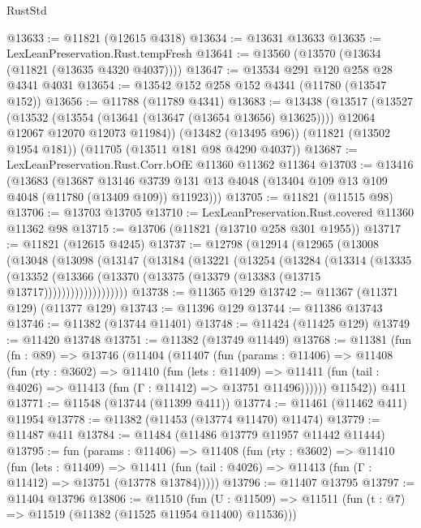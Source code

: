 \begin{lexlean}{RustStd}
\begin{coremodule}
@13633 := @11821 (@12615 @4318)
@13634 := @13631 @13633
@13635 := LexLeanPreservation.Rust.tempFresh
@13641 := @13560 (@13570 (@13634 (@11821 (@13635 @4320 @4037))))
@13647 := @13534 @291 @120 @258 @28 @4341 @4031
@13654 := @13542 @152 @258 @152 @4341 (@11780 (@13547 @152))
@13656 := @11788 (@11789 @4341)
@13683 := @13438
    (@13517
      (@13527
        (@13532 (@13554 (@13641 (@13647 (@13654 @13656) @13625))))
        @12064
        @12067
        @12070
        @12073
        @11984))
    (@13482 (@13495 @96))
    (@11821 (@13502 @1954 @181))
    (@11705 (@13511 @181 @98 @4290 @4037))
@13687 := LexLeanPreservation.Rust.Corr.bOfE @11360 @11362 @11364
@13703 := @13416
    (@13683
      (@13687
        @13146
        @3739
        @131
        @13
        @4048
        (@13404 @109 @13 @109 @4048 (@11780 (@13409 @109)) @11923)))
@13705 := @11821 (@11515 @98)
@13706 := @13703 @13705
@13710 := LexLeanPreservation.Rust.covered @11360 @11362 @98
@13715 := @13706 (@11821 (@13710 @258 @301 @1955))
@13717 := @11821 (@12615 @4245)
@13737 := @12798
    (@12914
      (@12965
        (@13008
          (@13048
            (@13098
              (@13147
                (@13184
                  (@13221
                    (@13254
                      (@13284
                        (@13314
                          (@13335
                            (@13352
                              (@13366
                                (@13370 (@13375 (@13379 (@13383 (@13715 @13717)))))))))))))))))))
@13738 := @11365 @129
@13742 := @11367 (@11371 @129) (@11377 @129)
@13743 := @11396 @129
@13744 := @11386 @13743
@13746 := @11382 (@13744 @11401)
@13748 := @11424 (@11425 @129)
@13749 := @11420 @13748
@13751 := @11382 (@13749 @11449)
@13768 := @11381
    (fun (fn : @89) =>
    @13746
      (@11404
        (@11407
          (fun (params : @11406) =>
          @11408
            (fun (rty : @3602) =>
            @11410
              (fun (lets : @11409) =>
              @11411 (fun (tail : @4026) => @11413 (fun (Γ : @11412) => @13751 @11496))))))
        @11542))
    @411
@13771 := @11548 (@13744 (@11399 @411))
@13774 := @11461 (@11462 @411) @11954
@13778 := @11382 (@11453 (@13774 @11470) @11474)
@13779 := @11487 @411
@13784 := @11484 (@11486 @13779 @11957 @11442 @11444)
@13795 := fun (params : @11406) =>
  @11408
    (fun (rty : @3602) =>
    @11410
      (fun (lets : @11409) =>
      @11411 (fun (tail : @4026) => @11413 (fun (Γ : @11412) => @13751 (@13778 @13784)))))
@13796 := @11407 @13795
@13797 := @11404 @13796
@13806 := @11510
    (fun (U : @11509) => @11511 (fun (t : @7) => @11519 (@11382 (@11525 @11954 @11400) @11536)))

\end{coremodule}
\end{lexlean}
